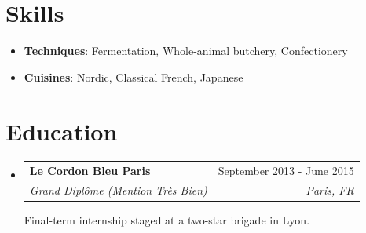 \documentclass[letterpaper,10.8pt]{article}
\makeatletter
\newcommand{\resumeItem}[2]{
  \item\small{
    \textbf{#1}{: #2 \vspace{-2pt}}
  }
}
\newcommand{\education}[4]{
  \vspace{0pt}\item[]
    \begin{tabular*}{1\textwidth}{l@{\extracolsep{\fill}}r}
      \textbf{#1} & #2 \\
      \textit{\small#3} & \textit{\small #4} \\
    \end{tabular*}\vspace{-4pt}
}
\newcommand{\resumeSubItem}[2]{\resumeItem{#1}{#2}\vspace{-5pt}}
\newcommand{\resumeSubHeadingListStart}{\begin{itemize}[leftmargin=*]}
\newcommand{\educationStart}{\begin{itemize}[leftmargin=0pt]}
\newcommand{\resumeSubHeadingListEnd}{\end{itemize}}
\makeatother
\begin{document}
\section{Skills}

\resumeSubHeadingListStart
  \resumeSubItem{Techniques}{Fermentation, Whole-animal butchery, Confectionery}
  \resumeSubItem{Cuisines}{Nordic, Classical French, Japanese}
\vspace{5pt} \resumeSubHeadingListEnd

\section{Education}

\educationStart
  \education{Le Cordon Bleu Paris}{September 2013 - June 2015}{Grand Diplôme (Mention Très Bien)}{Paris, FR}
  \par Final-term internship staged at a two-star brigade in Lyon.
\resumeSubHeadingListEnd
\end{document}
